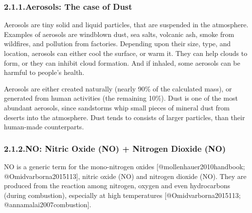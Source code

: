 \documentclass[9pt]{report}
\begin{document}
\subsubsection{2.1.1.\hspace*{0.5em}Aerosols: The case of Dust}\label{sec-aerosols--the-case-of-dust}%

\noindent{}Aerosols  are  tiny  solid  and  liquid  particles,  that  are  suspended  in  the atmosphere.
Examples  of  aerosols  are    windblown  dust,  sea salts,  volcanic ash,  smoke  from  wildfires,  and  pollution  from  factories.
Depending  upon their size, type, and location, aerosols can either cool the surface, or warm it.
They  can  help  clouds  to  form,  or  they  can  inhibit  cloud formation.
And  if inhaled, some aerosols can be harmful to people's health.%

Aerosols  are  either  created  naturally  (nearly  90\%  of  the  calculated mass), or generated from  human activities (the  remaining 10\%).
Dust is one of  the  most  abundant  aerosols,  since   sandstorms  whip small  pieces  of mineral  dust  from  deserts  into  the  atmosphere.
Dust  tends  to  consists  of larger  particles, than  their  human-made  counterparts.%

\subsubsection{2.1.2.\hspace*{0.5em}NO: Nitric Oxide (NO) + Nitrogen Dioxide (NO)}\label{sec-nox--nitric-oxide-no-nitrogen-dioxide-no2}%

\noindent{}NO is a generic term for the mono-nitrogen oxides [@mollenhauer2010handbook; @Omidvarborna2015113], nitric oxide (NO) and nitrogen dioxide (NO).
They are produced from the reaction among nitrogen, oxygen and even hydrocarbons (during combustion), especially at high temperatures [@Omidvarborna2015113; @annamalai2007combustion].%
\end{document}
